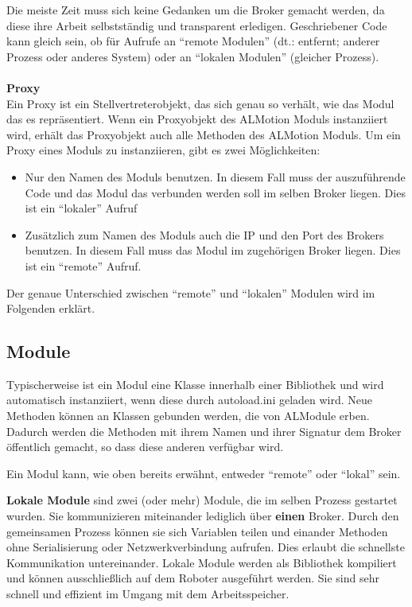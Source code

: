 Die meiste Zeit muss sich keine Gedanken um die Broker gemacht werden, da diese ihre Arbeit selbstständig und transparent erledigen. Geschriebener Code kann gleich sein, ob für Aufrufe an "`remote Modulen"' (dt.: entfernt; anderer Prozess oder anderes System) oder an "`lokalen Modulen"' (gleicher Prozess).
\\
\\
\textbf{Proxy}
\\
Ein Proxy ist ein Stellvertreterobjekt, das sich genau so verhält, wie das Modul das es repräsentiert. Wenn ein Proxyobjekt des ALMotion Moduls instanziiert wird, erhält das Proxyobjekt auch alle Methoden des \textsf{ALMotion} Moduls.
\newline
\newline
Um ein Proxy eines Moduls zu instanziieren, gibt es zwei Möglichkeiten: 
\begin{itemize}
\item Nur den Namen des Moduls benutzen. In diesem Fall muss der auszuführende Code und das Modul das verbunden werden soll im selben Broker liegen. Dies ist ein "`lokaler"' Aufruf
\item Zusätzlich zum Namen des Moduls auch die IP und den Port des Brokers benutzen. In diesem Fall muss das Modul im zugehörigen Broker liegen. Dies ist ein "`remote"' Aufruf.
\end{itemize}
Der genaue Unterschied zwischen "`remote"' und "`lokalen"' Modulen wird im Folgenden erklärt.
\\
\subsection{Module}
Typischerweise ist ein Modul eine Klasse innerhalb einer Bibliothek und wird automatisch instanziiert, wenn diese  durch \textsf{autoload.ini} geladen wird. Neue Methoden können an Klassen gebunden werden, die von \textsf{ALModule} erben. Dadurch werden die Methoden mit ihrem Namen und ihrer Signatur dem Broker öffentlich gemacht, so dass diese anderen verfügbar wird.

Ein Modul kann, wie oben bereits erwähnt, entweder "`remote"' oder "`lokal"' sein. 

\textbf{Lokale Module } sind zwei (oder mehr) Module, die im selben Prozess gestartet wurden. Sie kommunizieren miteinander lediglich über \textbf{einen} Broker. Durch den gemeinsamen Prozess können sie sich  Variablen teilen und einander Methoden ohne Serialisierung oder Netzwerkverbindung aufrufen. Dies erlaubt die schnellste Kommunikation untereinander. Lokale Module werden als Bibliothek kompiliert und können ausschließlich auf dem Roboter ausgeführt werden. Sie sind sehr schnell und effizient im Umgang mit dem Arbeitsspeicher.

